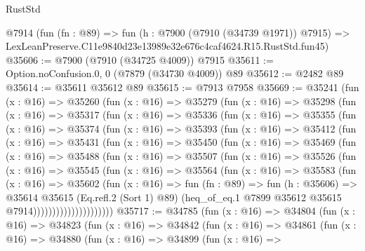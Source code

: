 \begin{lexlean}{RustStd}
\begin{coremodule}
    @7914
    (fun (fn : @89) =>
    fun (h : @7900 (@7910 (@34739 @1971)) @7915) =>
    LexLeanPreserve.C11e9840d23e13989e32e676c4caf4624.R15.RustStd.fun45)
@35606 := @7900 (@7910 (@34725 @4009)) @7915
@35611 := Option.noConfusion.{0, 0} (@7879 (@34730 @4009)) @89
@35612 := @2482 @89
@35614 := @35611 @35612 @89
@35615 := @7913 @7958
@35669 := @35241
    (fun (x : @16) =>
    @35260
      (fun (x : @16) =>
      @35279
        (fun (x : @16) =>
        @35298
          (fun (x : @16) =>
          @35317
            (fun (x : @16) =>
            @35336
              (fun (x : @16) =>
              @35355
                (fun (x : @16) =>
                @35374
                  (fun (x : @16) =>
                  @35393
                    (fun (x : @16) =>
                    @35412
                      (fun (x : @16) =>
                      @35431
                        (fun (x : @16) =>
                        @35450
                          (fun (x : @16) =>
                          @35469
                            (fun (x : @16) =>
                            @35488
                              (fun (x : @16) =>
                              @35507
                                (fun (x : @16) =>
                                @35526
                                  (fun (x : @16) =>
                                  @35545
                                    (fun (x : @16) =>
                                    @35564
                                      (fun (x : @16) =>
                                      @35583
                                        (fun (x : @16) =>
                                        @35602
                                          (fun (x : @16) =>
                                          fun (fn : @89) =>
                                          fun (h : @35606) =>
                                          @35614
                                            @35615
                                            (Eq.refl.{2} (Sort 1) @89)
                                            (heq_of_eq.{1}
                                              @7899
                                              @35612
                                              @35615
                                              @7914)))))))))))))))))))))
@35717 := @34785
    (fun (x : @16) =>
    @34804
      (fun (x : @16) =>
      @34823
        (fun (x : @16) =>
        @34842
          (fun (x : @16) =>
          @34861
            (fun (x : @16) =>
            @34880
              (fun (x : @16) =>
              @34899
                (fun (x : @16) =>

\end{coremodule}
\end{lexlean}
